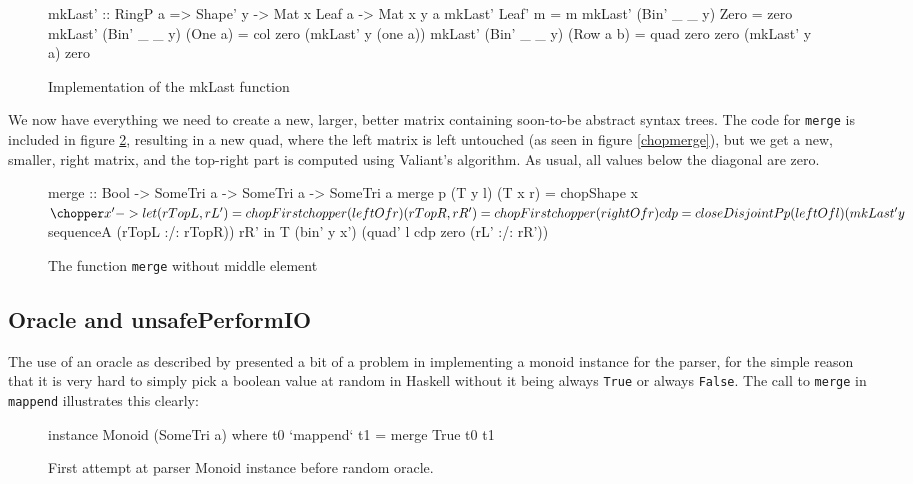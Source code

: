 \documentclass[a4paper,12pt,twosided]{report}
\begin{document}
\begin{figure}[H]
\begin{code}
mkLast' :: RingP a => Shape' y -> Mat x Leaf a -> Mat x y a
mkLast' Leaf' m = m
mkLast' (Bin' _ _ y) Zero = zero
mkLast' (Bin' _ _ y) (One a) = col zero (mkLast' y (one a))
mkLast' (Bin' _ _ y) (Row a b) = quad zero zero (mkLast' y a) zero
\end{code}
\caption{\label{mklast}Implementation of the mkLast function}
\end{figure}

We now have everything we need to create a new, larger, better matrix containing
soon-to-be abstract syntax trees. The code for \texttt{merge} is included in
figure \ref{merge}, resulting in a new quad, where the left matrix is left
untouched (as seen in figure \ref{chopmerge}), but we get a new, smaller, right
matrix, and the top-right part is computed using Valiant's algorithm. As usual,
all values below the diagonal are zero.

\begin{figure}[H]
\begin{code}
merge :: Bool -> SomeTri a -> SomeTri a -> SomeTri a
merge p (T y l) (T x r) = chopShape x $ \chopper x' ->
    let (rTopL, rL') = chopFirst chopper (leftOf r)
        (rTopR, rR') = chopFirst chopper (rightOf r)
        cdp = closeDisjointP p (leftOf l) 
                (mkLast' y $ sequenceA (rTopL :/: rTopR)) rR'
    in T (bin' y x') (quad' l cdp zero (rL' :/: rR'))
\end{code}
\caption{The function \texttt{merge} without middle element}
\label{merge}
\end{figure}

\subsection{Oracle and unsafePerformIO}
\label{oraclesection}
The use of an oracle as described by \citet{parparsepaper} presented a bit
of a problem in implementing a monoid instance for the parser, for the simple
reason that it is very hard to simply pick a boolean value at random in Haskell
without it being always \texttt{True} or always \texttt{False}. The call to
\texttt{merge} in \texttt{mappend} illustrates this clearly:

\begin{figure}[H]
\begin{code}
instance Monoid (SomeTri a) where
    t0 `mappend` t1 = merge True t0 t1
\end{code}
\caption{First attempt at parser Monoid instance before random oracle.}
\end{figure}
\end{document}
